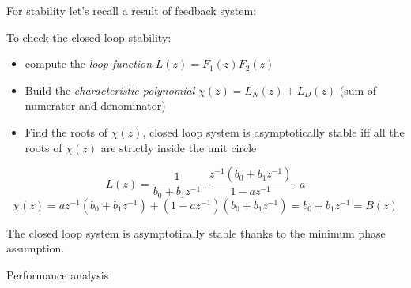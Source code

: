 
\begin{remark}
    For stability let's recall a result of feedback system:
    \begin{figure}[H]
        \centering
    \end{figure}

    To check the closed-loop stability:
    \begin{itemize}
        \item compute the \emph{loop-function} $L(z) = F_1(z) F_2(z)$
        \item Build the \emph{characteristic polynomial} $\chi(z) = L_N(z) + L_D(z)$ (sum of numerator and denominator)
        \item Find the roots of $\chi(z)$, closed loop system is asymptotically stable iff all the roots of $\chi(z)$ are strictly inside the unit circle
    \end{itemize}
\end{remark}

\[
    L(z) = \frac{1}{b_0+b_1z^{-1}} \cdot \frac{z^{-1}(b_0+b_1z^{-1})}{1-az^{-1}} \cdot a
\]
\[
    \chi(z) = az^{-1}(b_0+b_1z^{-1}) + (1-az^{-1})(b_0+b_1z^{-1}) = b_0+b_1z^{-1} = B(z)
\]

The closed loop system is asymptotically stable thanks to the minimum phase assumption.

Performance analysis
\begin{figure}[H]
    \centering
\end{figure}

